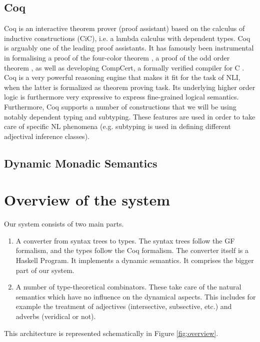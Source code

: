 \documentclass{article}
\begin{document}
\subsection{Coq}
Coq is an  interactive theorem prover (proof assistant)  based on the calculus of inductive
constructions (CiC), i.e.  a lambda calculus with dependent
types. Coq is arguably one of the leading proof assistants. It has
famously been instrumental in formalising a proof of the four-color
theorem \citep{Gonthier:2008}, a proof of the odd order theorem \citep{Gonthier:2013}, as well as developing CompCert, a formally verified compiler for C \citep{Leroy}. Coq is a very powerful reasoning engine that makes it fit for the task of NLI, when the latter is formalized as theorem proving task. Its underlying higher order logic is furthermore very expressive to express fine-grained logical semantics. Furthermore, Coq supports a number of constructions that we will be using notably dependent typing and subtyping. These features are used in order to take care of specific NL phenomena (e.g. subtyping is used in defining different adjectival inference classes).

\subsection{Dynamic Monadic Semantics}



\section{Overview of the system}

Our system consists of two main parts.
\begin{enumerate}
\item A converter from syntax trees to types. The syntax trees follow
  the GF formalism, and the types follow the Coq formalism. The
  converter itself is a Haskell Program. It implements a dynamic
  semantics. It comprises the bigger part of our system.
\item A number of type-theoretical combinators. These take care of the
  natural semantics which have no influence on the dynamical
  aspects. This includes for example the treatment of adjectives
  (intersective, subsective, etc.) and adverbs (veridical or not).
\end{enumerate}
This architecture is represented schematically in Figure \ref{fig:overview}.
\end{document}
